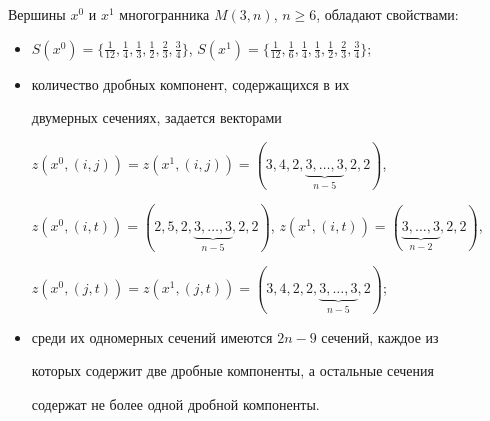 \begin{cor}


Вершины $x^0$ и $x^1$ многогранника $M(3,n)$, $n\geq


6$, обладают свойствами:


\begin{itemize}


\item[1)] $S(x^0)=\{\frac{1}{12},\frac{1}{4},\frac{1}{3},\frac{1}{2},


\frac{2}{3},\frac{3}{4} \}$, $S(x^1)=\{\frac{1}{12},\frac{1}{6},


\frac{1}{4},\frac{1}{3},\frac{1}{2},\frac{2}{3},\frac{3}{4}\}$;


\item[2)] количество дробных компонент, содержащихся в их


двумерных сечениях, задается векторами


$z(x^0,(i,j))=z(x^1,(i,j))=(3,4,2,\underbrace{3,\dotsc,3}_{n-5},2,2)$,


$z(x^0,(i,t))=(2,5,2,\underbrace{3,\dotsc,3}_


{n-5},2,2)$, $z(x^1,(i,t))=(\underbrace{3,\dotsc,3}_{n-2} ,2,2)$,


$z(x^0,(j,t))=z(x^1,(j,t))=(3,4,2,2,\underbrace{3,\dotsc,3}_{n-5} ,2)$;


\item[3)] среди их одномерных сечений имеются $2n-9$ сечений, каждое из


которых содержит две дробные компоненты, а остальные сечения


содержат не более одной дробной компоненты.


\end{itemize}


\end{cor}





